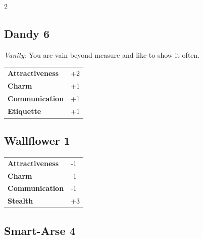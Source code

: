 \begin{multicols}{2}
\begin{tcolorbox}
    \subsection*{Dandy \hfill \small{6 }}
    \tcblower
\textit{Vanity}: You are vain beyond measure and like to show it often.


\vspace{3mm}

\begin{tabular}{@{}ll@{}}
    \textbf{Attractiveness} & +2\\
    \textbf{Charm} & +1\\
    \textbf{Communication} & +1\\
    \textbf{Etiquette} & +1\\
\end{tabular}


\end{tcolorbox}

\begin{tcolorbox}
    \subsection*{Wallflower \hfill \small{1 }}
    \tcblower




\begin{tabular}{@{}ll@{}}
    \textbf{Attractiveness} & -1\\
    \textbf{Charm} & -1\\
    \textbf{Communication} & -1\\
    \textbf{Stealth} & +3\\
\end{tabular}


\end{tcolorbox}

\begin{tcolorbox}
    \subsection*{Smart-Arse \hfill \small{4 }}
    \tcblower





\end{tcolorbox}
\end{multicols}
